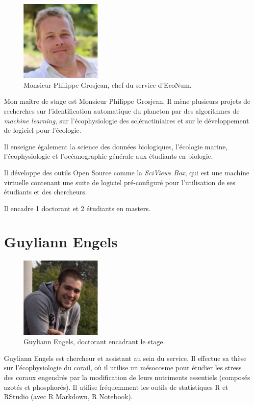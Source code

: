 \documentclass[]{report}
\begin{document}
\begin{figure}[h!]
\includegraphics[width=4cm]{../image/Grosjean2.jpg}
\caption{Monsieur Philippe Grosjean, chef du service d'EcoNum.}
\end{figure}

Mon maître de stage est Monsieur Philippe Grosjean. Il mène plusieurs
projets de recherches sur l'identification automatique du plancton par
des algorithmes de \emph{machine learning}, sur l'écophysiologie des
scléractiniaires et sur le développement de logiciel pour l'écologie.

Il enseigne également la science des données biologiques, l'écologie
marine, l'écophysiologie et l'océanographie générale aux étudiants en
biologie.

Il développe des outils Open Source comme la \emph{SciViews Box}, qui
est une machine virtuelle contenant une suite de logiciel pré-configuré
pour l'utilisation de ses étudiants et des chercheurs.

Il encadre 1 doctorant et 2 étudiants en masters.

\section{Guyliann Engels}\label{guyliann-engels}

\begin{figure}[h!]
\includegraphics[width=4cm]{../image/Guyliann.jpg}
\caption{Guyliann Engels, doctorant encadrant le stage.}
\end{figure}

Guyliann Engels est chercheur et assistant au sein du service. Il
effectue sa thèse sur l'écophysiologie du corail, où il utilise un
mésocosme pour étudier les stress des coraux engendrés par la
modification de leurs nutriments essentiels (composés azotés et
phosphorés). Il utilise fréquemment les outils de statistiques R et
RStudio (avec R Markdown, R Notebook).
\end{document}
